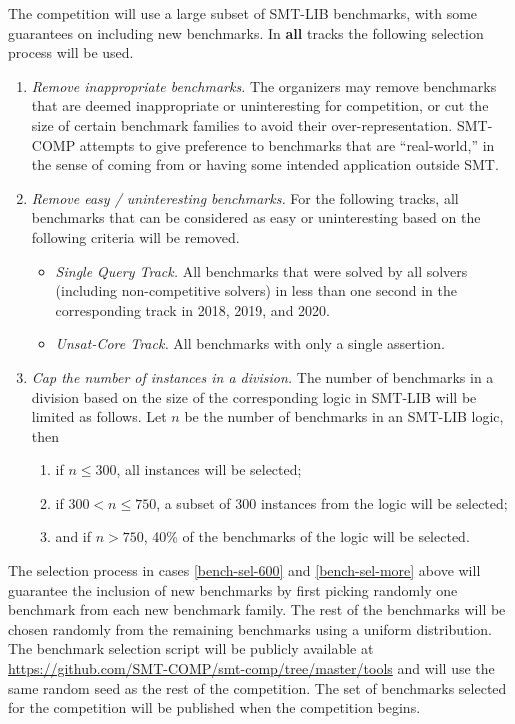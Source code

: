 \documentclass[12pt]{article}
\newcommand{\maintrack}{Single Query Track\xspace}
\newcommand{\ucoretrack}{Unsat-Core Track\xspace}
\newcommand{\challtrack}{Industry-Challenge Track\xspace}
\begin{document}
 \label{benchmark-selection}
The competition will use a large subset of SMT-LIB benchmarks, with some
guarantees on including new benchmarks.  In \textbf{all} tracks
the following selection process will be used.
\begin{enumerate}
\item \emph{Remove inappropriate benchmarks.} The
  organizers may remove benchmarks that are deemed inappropriate or
  uninteresting for competition, or cut the size of certain benchmark
  families to avoid their over-representation.  SMT-COMP attempts to
  give preference to benchmarks that are ``real-world,'' in the sense
  of coming from or having some intended application outside SMT.
\item \emph{Remove easy / uninteresting benchmarks.}
  For the following tracks, all benchmarks that can be
  considered as easy or uninteresting based on the following criteria
  will be removed.
  \begin{itemize}
    \item \emph{\maintrack.} All benchmarks that were solved by all
      solvers (including non-competitive solvers) in less than one second in
          the corresponding track in 2018, 2019, and 2020.
    \item \emph{\ucoretrack.} All benchmarks with only a single assertion.
  \end{itemize}
\item \emph{Cap the number of instances in a division.}
  The number of benchmarks in a division based on the size of the
  corresponding logic in SMT-LIB will be limited as follows.
  Let $n$ be the number of benchmarks in an SMT-LIB logic, then
  \begin{enumerate}
  \vspace{-1ex}
    \item \label{bench-sel-300} if $n \le 300$, all instances will be selected;
  \item \label{bench-sel-600} if $300 < n \leq 750$, a subset of 300 instances
    from the logic will be selected;
  \item \label{bench-sel-more} and if $n > 750$,
      40\% of the benchmarks of the logic will be selected.
  \end{enumerate}
\end{enumerate}
%
The selection process in cases \ref{bench-sel-600} and \ref{bench-sel-more}
above will guarantee the inclusion of new benchmarks by first picking randomly
one benchmark from each new benchmark family.  The rest of the benchmarks will
be chosen randomly from the remaining benchmarks using a uniform distribution.
%
The benchmark selection script will be publicly available at
\url{https://github.com/SMT-COMP/smt-comp/tree/master/tools} and
will use the same random seed as the rest of the competition.  The set of
benchmarks selected for the competition will be published when the competition
begins.
\end{document}
